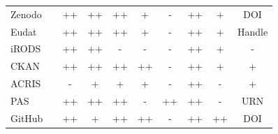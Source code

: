 \begin{table}
{\begin{tabular}{| l | c | c | c | c | c | c | c | c | c |}
            \cellcolor{first-column-blue}Zenodo   && \cellcolor{green}++ & \cellcolor{green}++ & \cellcolor{green}++ & \cellcolor{yellow}+  & \cellcolor{red}-  &  \cellcolor{green}++ & \cellcolor{yellow}+  & \cellcolor{green}DOI \\
            \cline{3-10}\cline{1-1}
            \cellcolor{first-column-blue}Eudat    && \cellcolor{green}++ & \cellcolor{green}++ & \cellcolor{green}++ & \cellcolor{yellow}+  & \cellcolor{red}-  &  \cellcolor{green}++ & \cellcolor{yellow}+  & \cellcolor{green}Handle \\
            \cline{3-10}\cline{1-1}
            \cellcolor{first-column-blue}iRODS    && \cellcolor{green}++ & \cellcolor{green}++ & \cellcolor{red}-  & \cellcolor{red}-  & \cellcolor{red}-  &  \cellcolor{green}++ & \cellcolor{yellow}+  & \cellcolor{red}- \\
            \cline{3-10}\cline{1-1}
            \cellcolor{first-column-blue}CKAN     && \cellcolor{green}++ & \cellcolor{green}++ & \cellcolor{green}++ & \cellcolor{green}++ & \cellcolor{red}-  &  \cellcolor{green}++ & \cellcolor{yellow}+  & \cellcolor{yellow}+ \\
            \cline{3-10}\cline{1-1}
            \cellcolor{first-column-blue}ACRIS    && \cellcolor{red}-  & \cellcolor{yellow}+  & \cellcolor{yellow}+  & \cellcolor{yellow}+  & \cellcolor{red}-  &  \cellcolor{green}++ & \cellcolor{red}-  & \cellcolor{yellow}+ \\
            \cline{3-10}\cline{1-1}
            \cellcolor{first-column-blue}PAS      && \cellcolor{green}++ & \cellcolor{green}++ & \cellcolor{green}++ & \cellcolor{red}-  & \cellcolor{green}++ &  \cellcolor{green}++ & \cellcolor{red}-  & \cellcolor{green}URN \\
            \cline{3-10}\cline{1-1}
            \cellcolor{first-column-blue}GitHub   && \cellcolor{green}++ & \cellcolor{yellow}+  & \cellcolor{green}++ & \cellcolor{green}++ & \cellcolor{red}-  &  \cellcolor{green}++ & \cellcolor{green}++ & \cellcolor{green}DOI \\
            \cline{3-10}\cline{1-1}
        \end{tabular}
    }
\end{table}

